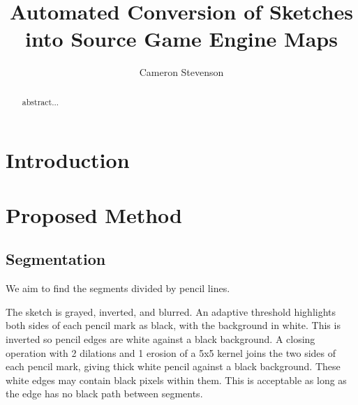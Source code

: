 \documentclass{IEEEtran}
\begin{document}
\title{Automated Conversion of Sketches into Source Game Engine Maps}
\author{Cameron Stevenson}
 
\begin{abstract}
abstract...
\end{abstract}

\maketitle

\section{Introduction}

\section{Proposed Method}
\subsection{Segmentation}
We aim to find the segments divided by pencil lines.

The sketch is grayed, inverted, and blurred. An adaptive threshold highlights both sides of each pencil mark as black, with the background in white. This is inverted so pencil edges are white against a black background. A closing operation with 2 dilations and 1 erosion of a 5x5 kernel joins the two sides of each pencil mark, giving thick white pencil against a black background. These white edges may contain black pixels within them. This is acceptable as long as the edge has no black path between segments.



\end{document}
